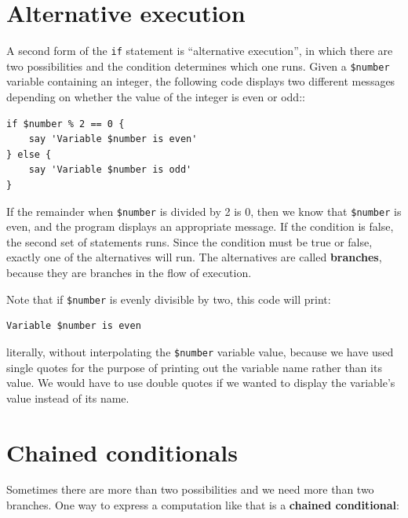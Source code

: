 \section{Alternative execution}
\label{alternative.execution}

A second form of the {\tt if} statement is ``alternative execution'',
in which there are two possibilities and the condition determines
which one runs.  Given a \verb'$number' variable containing an 
integer, the following code displays two different messages 
depending on whether the value of the integer is even or odd::

\begin{verbatim}
if $number % 2 == 0 {
    say 'Variable $number is even'
} else {
    say 'Variable $number is odd'
}
\end{verbatim}
%
If the remainder when {\tt \$number} is divided by 2 is 0, 
then we know that {\tt \$number} is even, and the program 
displays an appropriate message.  If
the condition is false, the second set of statements runs.
Since the condition must be true or false, exactly one of the
alternatives will run.  The alternatives are called 
{\bf branches}, because they are branches in the flow of 
execution.

Note that if \verb'$number' is evenly divisible by two, 
this code will print:

\begin{verbatim} 
Variable $number is even
\end{verbatim}

literally, without interpolating the \verb'$number' variable 
value, because we have used single quotes for the purpose 
of printing out the variable name rather 
than its value. We would have to use double quotes if 
we wanted to display the variable's value instead of its 
name.


\section{Chained conditionals}

Sometimes there are more than two possibilities and we need more than
two branches.  One way to express a computation like that is a 
{\bf chained conditional}:

